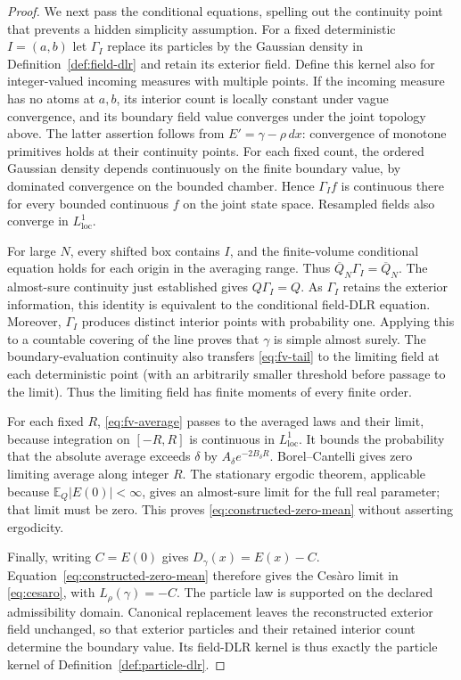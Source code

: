 \documentclass[11pt,reqno]{amsart}
\theoremstyle{definition}
\theoremstyle{remark}
\newcommand{\E}{\mathbb E}
\newcommand{\1}{\mathbf 1}
\numberwithin{equation}{section}
\begin{document}
\begin{proof}
We next pass the conditional equations, spelling out the continuity
point that prevents a hidden simplicity assumption. For a fixed
deterministic $I=(a,b)$ let $\Gamma_I$ replace its particles by the
Gaussian density in Definition~\ref{def:field-dlr} and retain its
exterior field. Define this kernel also for integer-valued incoming
measures with multiple points. If the incoming measure has no atoms at
$a,b$, its interior count is locally constant under vague convergence,
and its boundary field value converges under the joint topology above.
The latter assertion follows from $E'=\gamma-\rho\,dx$: convergence
of monotone primitives holds at their continuity points.
For each fixed count, the ordered Gaussian density depends
continuously on the finite boundary value, by dominated convergence on
the bounded chamber. Hence $\Gamma_I f$ is continuous there for every
bounded continuous $f$ on the joint state space. Resampled fields also
converge in $L^1_{\mathrm{loc}}$.

For large $N$, every shifted box contains $I$, and the finite-volume
conditional equation holds for each origin in the averaging range.
Thus $\overline Q_N\Gamma_I=\overline Q_N$. The almost-sure continuity
just established gives $Q\Gamma_I=Q$. As $\Gamma_I$ retains the
exterior information, this identity is equivalent to the conditional
field-DLR equation. Moreover, $\Gamma_I$ produces distinct interior
points with probability one. Applying this to a countable covering of
the line proves that $\gamma$ is simple almost surely.
The boundary-evaluation continuity also transfers \eqref{eq:fv-tail}
to the limiting field at each deterministic point (with an arbitrarily
smaller threshold before passage to the limit). Thus the limiting field
has finite moments of every finite order.

For each fixed $R$, \eqref{eq:fv-average} passes to the averaged laws
and their limit, because integration on $[-R,R]$ is continuous in
$L^1_{\mathrm{loc}}$. It bounds the probability that the absolute
average exceeds $\delta$ by
$A_\delta e^{-2B_\delta R}$. Borel--Cantelli gives zero limiting average
along integer $R$. The stationary ergodic theorem, applicable because
$\E_Q|E(0)|<\infty$, gives an almost-sure limit for the full real
parameter; that limit must be zero. This proves
\eqref{eq:constructed-zero-mean} without asserting ergodicity.

Finally, writing $C=E(0)$ gives $D_\gamma(x)=E(x)-C$.
Equation~\eqref{eq:constructed-zero-mean} therefore gives the Ces\`aro
limit in \eqref{eq:cesaro}, with $L_\rho(\gamma)=-C$.
The particle law is supported on the declared admissibility domain.
Canonical replacement leaves the reconstructed exterior field
unchanged, so that exterior particles and their retained interior
count determine the boundary value. Its field-DLR kernel is thus
exactly the particle kernel of Definition~\ref{def:particle-dlr}.
\end{proof}
\end{document}
